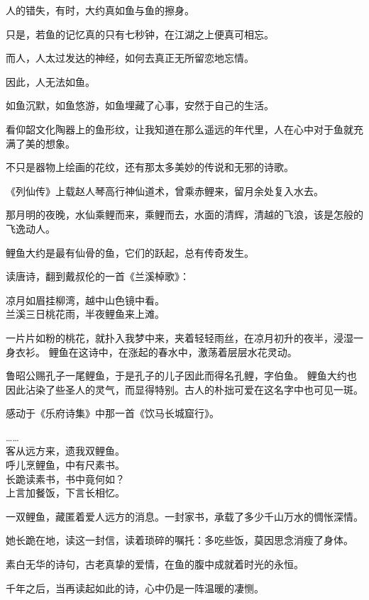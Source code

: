 		\vspace{1em}
		人的错失，有时，大约真如鱼与鱼的擦身。\par
		只是，若鱼的记忆真的只有七秒钟，在江湖之上便真可相忘。\par
		而人，人太过发达的神经，如何去真正无所留恋地忘情。

		\vspace{1em}
		因此，人无法如鱼。\par
		如鱼沉默，如鱼悠游，如鱼埋藏了心事，安然于自己的生活。

		\vspace{1em}
		看仰韶文化陶器上的鱼形纹，让我知道在那么遥远的年代里，人在心中对于鱼就充满了美的想象。\par
		不只是器物上绘画的花纹，还有那太多美妙的传说和无邪的诗歌。

		《列仙传》上载赵人琴高行神仙道术，曾乘赤鲤来，留月余处复入水去。\par
		那月明的夜晚，水仙乘鲤而来，乘鲤而去，水面的清辉，清越的飞浪，该是怎般的飞逸动人。

		鲤鱼大约是最有仙骨的鱼，它们的跃起，总有传奇发生。

		读唐诗，翻到戴叔伦的一首《兰溪棹歌》：

		\shortpoem{}{}{}
			凉月如眉挂柳湾，越中山色镜中看。\\
			兰溪三日桃花雨，半夜鲤鱼来上滩。\\
		\endshortpoem

		一片片如粉的桃花，就扑入我梦中来，夹着轻轻雨丝，在凉月初升的夜半，浸湿一身衣衫。
		鲤鱼在这诗中，在涨起的春水中，激荡着层层水花灵动。

		鲁昭公赐孔子一尾鲤鱼，于是孔子的儿子因此而得名孔鲤，字伯鱼。
		鲤鱼大约也因此沾染了些圣人的灵气，而显得特别。古人的朴拙可爱在这名字中也可见一斑。

		感动于《乐府诗集》中那一首《饮马长城窟行》。

		\shortpoem{}{}{}
			…… \\
			客从远方来，遗我双鲤鱼。\\
			呼儿烹鲤鱼，中有尺素书。\\
			长跪读素书，书中竟何如？\\
			上言加餐饭，下言长相忆。\\
		\endshortpoem

		一双鲤鱼，藏匿着爱人远方的消息。一封家书，承载了多少千山万水的惆怅深情。\par
		她长跪在地，读这一封信，读着琐碎的嘱托：多吃些饭，莫因思念消瘦了身体。\par
		素白无华的诗句，古老真挚的爱情，在鱼的腹中成就着时光的永恒。\par
		千年之后，当再读起如此的诗，心中仍是一阵温暖的凄恻。

